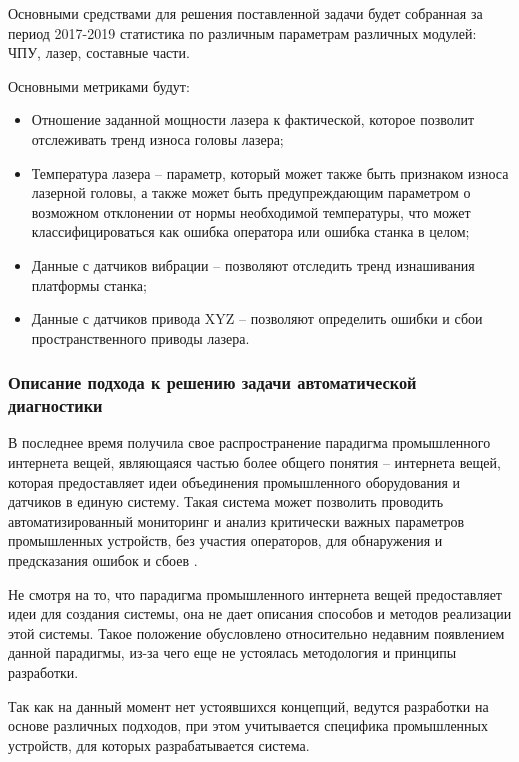Основными средствами для решения поставленной задачи
будет собранная за период 2017-2019 статистика
по различным параметрам различных модулей:
ЧПУ, лазер, составные части.

Основными метриками будут:

\begin{itemize}
    \item Отношение заданной мощности лазера к фактической, которое позволит
    отслеживать тренд износа головы лазера;
    \item Температура лазера -- параметр, который может также быть признаком износа
    лазерной головы, а также может быть предупреждающим параметром о возможном отклонении
    от нормы необходимой температуры, что может классифицироваться как ошибка оператора или ошибка станка в целом;
    \item Данные с датчиков вибрации -- позволяют отследить тренд изнашивания платформы станка;
    \item Данные с датчиков привода XYZ -- позволяют определить ошибки и сбои пространственного приводы лазера.
\end{itemize}




\subsubsection{Описание подхода к решению задачи автоматической диагностики}

В последнее время получила свое распространение
парадигма промышленного интернета вещей,
являющаяся частью более общего понятия -- интернета вещей,
которая предоставляет идеи объединения
промышленного оборудования и датчиков в единую систему.
Такая система может позволить проводить автоматизированный мониторинг и 
анализ критически важных параметров промышленных устройств,
без участия операторов, для обнаружения и предсказания ошибок и сбоев \cite{iiot}.

Не смотря на то, что парадигма промышленного интернета вещей предоставляет идеи
для создания системы, она не дает описания способов и методов реализации этой системы.
Такое положение обусловлено относительно недавним появлением данной парадигмы,
из-за чего еще не устоялась методология и принципы разработки.

Так как на данный момент нет устоявшихся концепций,
ведутся разработки на основе различных подходов,
при этом учитывается специфика промышленных устройств,
для которых разрабатывается система.

